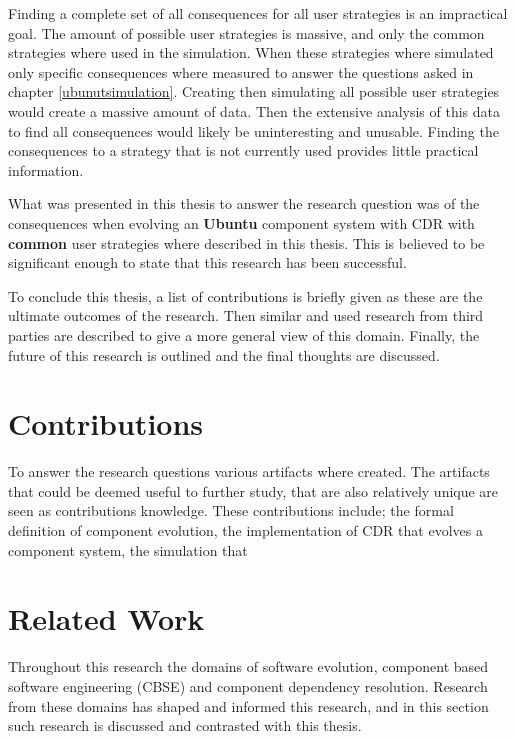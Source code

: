 Finding a complete set of all consequences for all user strategies is an impractical goal.
The amount of possible user strategies is massive, and only the common strategies where used in the simulation.
When these strategies where simulated only specific consequences where measured to answer the questions asked in chapter \ref{ubunutsimulation}.
Creating then simulating all possible user strategies would create a massive amount of data.
Then the extensive analysis of this data to find all consequences would likely be uninteresting and unusable.
Finding the consequences to a strategy that is not currently used provides little practical information.

What was presented in this thesis to answer the research question was 
 of the consequences when evolving an \textbf{Ubuntu} component system with CDR with \textbf{common} user strategies where described in this thesis.
This is believed to be significant enough to state that this research has been successful.  

To conclude this thesis, a list of contributions is briefly given as these are the ultimate outcomes of the research.
Then similar and used research from third parties are described to give a more general view of this domain.
Finally, the future of this research is outlined and the final thoughts are discussed.

\section{Contributions}
To answer the research questions various artifacts where created.
The artifacts that could be deemed useful to further study, that are also relatively unique are seen as contributions knowledge. 
These contributions include; the formal definition of component evolution, the implementation of CDR that evolves a component system,
the simulation that  






\section{Related Work}
Throughout this research the domains of software evolution, component based software engineering (CBSE) and component dependency resolution.
Research from these domains has shaped and informed this research, and in this section such research is discussed and contrasted with this thesis.


